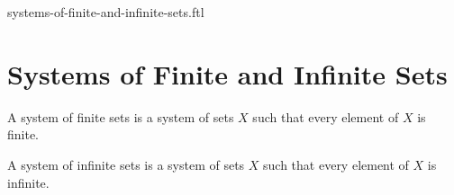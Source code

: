 \documentclass{naproche-library}
\begin{document}
\begin{smodule}{systems-of-finite-and-infinite-sets.ftl}

  \section*{Systems of Finite and Infinite Sets}

  \begin{definition}[forthel,id=FOUNDATIONS_14_1387314525765632,printid]
    A system of finite sets is a system of sets $X$ such that every element of $X$ is finite.
  \end{definition}

  \begin{definition}[forthel,id=FOUNDATIONS_14_5698452102154785,printid]
    A system of infinite sets is a system of sets $X$ such that every element of $X$ is infinite.
  \end{definition}
\end{smodule}
\end{document}
